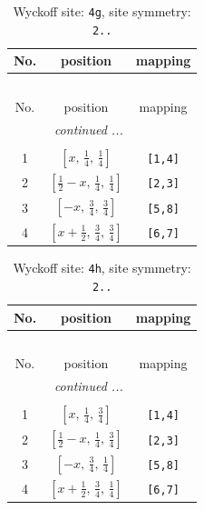 \documentclass[fleqn,8pt]{jsarticle}
\begin{document}
\renewcommand{\arraystretch}{1.2}
\begin{longtable}{ccc}
\caption{Wyckoff site: {\tt 4g}, site symmetry: {\tt 2..}}
 \\
 \hline \hline
No. & position & mapping \\ \hline \endfirsthead

\multicolumn{2}{l}{\tablename\ \thetable{}} \\
 \hline \hline
No. & position & mapping \\ \hline \endhead

 \hline \hline
\multicolumn{2}{r}{\footnotesize\it continued ...} \\ \endfoot

 \hline \hline
\multicolumn{2}{r}{} \\ \endlastfoot

1 & $\left[ x,\, \frac{1}{4},\, \frac{1}{4} \right]$ & {\tt [1,4]} \\ \hline
2 & $\left[ \frac{1}{2} - x,\, \frac{1}{4},\, \frac{1}{4} \right]$ & {\tt [2,3]} \\ \hline
3 & $\left[ - x,\, \frac{3}{4},\, \frac{3}{4} \right]$ & {\tt [5,8]} \\ \hline
4 & $\left[ x + \frac{1}{2},\, \frac{3}{4},\, \frac{3}{4} \right]$ & {\tt [6,7]} \\
\end{longtable}
\renewcommand{\arraystretch}{1.2}
\begin{longtable}{ccc}
\caption{Wyckoff site: {\tt 4h}, site symmetry: {\tt 2..}}
 \\
 \hline \hline
No. & position & mapping \\ \hline \endfirsthead

\multicolumn{2}{l}{\tablename\ \thetable{}} \\
 \hline \hline
No. & position & mapping \\ \hline \endhead

 \hline \hline
\multicolumn{2}{r}{\footnotesize\it continued ...} \\ \endfoot

 \hline \hline
\multicolumn{2}{r}{} \\ \endlastfoot

1 & $\left[ x,\, \frac{1}{4},\, \frac{3}{4} \right]$ & {\tt [1,4]} \\ \hline
2 & $\left[ \frac{1}{2} - x,\, \frac{1}{4},\, \frac{3}{4} \right]$ & {\tt [2,3]} \\ \hline
3 & $\left[ - x,\, \frac{3}{4},\, \frac{1}{4} \right]$ & {\tt [5,8]} \\ \hline
4 & $\left[ x + \frac{1}{2},\, \frac{3}{4},\, \frac{1}{4} \right]$ & {\tt [6,7]} \\
\end{longtable}
\end{document}
